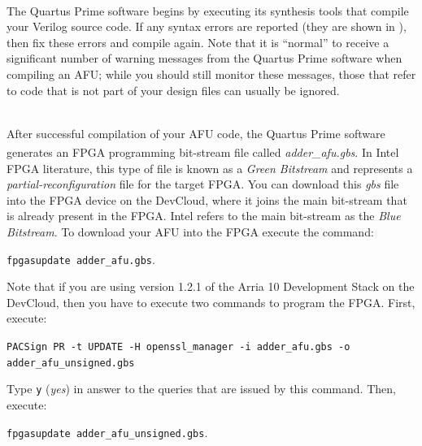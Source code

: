 \documentclass[11pt, twoside, pdftex]{article}
\newcommand{\red}[1]{{\color{red}\sf{#1}}}
\begin{document}
\begin{enumerate}
~\\
\noindent
The Quartus Prime software begins by executing its synthesis tools that
compile your Verilog source code. If any syntax errors are reported (they are shown in 
\red{red}), then fix these errors and compile again. Note that it is 
``normal'' to receive a significant number of warning messages from the Quartus Prime 
software when compiling an AFU; while you should still monitor these messages, those that
refer to code that is not part of your design files can usually be ignored.

~\\
\noindent
After successful compilation of your AFU code, the Quartus Prime software generates an FPGA 
programming bit-stream file called {\it adder\_afu.gbs}. In Intel\textsuperscript{\textregistered}
FPGA literature, this type of file is known as a {\it Green Bitstream} and represents a 
{\it partial-reconfiguration} file for the target FPGA. You can download this {\it gbs} file 
into the FPGA device on the DevCloud, where it joins the main bit-stream that is 
already present in the FPGA. Intel refers to the main bit-stream as the {\it Blue Bitstream}. 
To download your AFU into the FPGA execute the command:

\noindent
\begin{center}
\texttt{fpgasupdate adder\_afu.gbs}.
\end{center}

Note that if you are using version 1.2.1 of the Arria 10 Development Stack on the
DevCloud, then you have to execute two commands to program the FPGA. First, execute:

\noindent
\begin{center}
\texttt{PACSign PR -t UPDATE -H openssl\_manager -i adder\_afu.gbs -o adder\_afu\_unsigned.gbs}
\end{center}

\noindent Type \texttt{y} ({\it yes}) in answer to the queries that are issued by this command. 
Then, execute:

\noindent
\begin{center}
\texttt{fpgasupdate adder\_afu\_unsigned.gbs}.
\end{center}
\end{enumerate}
\end{document}
